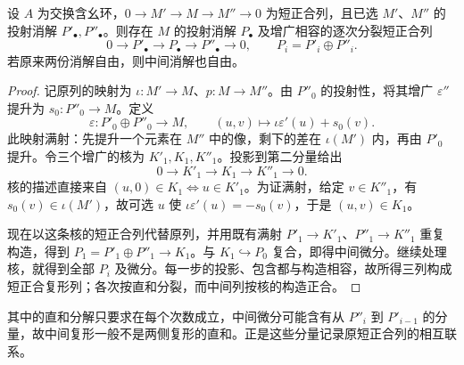 \begin{lemma}[马蹄引理]\label{g5:lem:horseshoe}
	设 \(A\) 为交换含幺环，\(0\to M'\to M\to M''\to0\) 为短正合列，且已选 \(M'\)、\(M''\) 的投射消解 \(P'_\bullet,P''_\bullet\)。则存在 \(M\) 的投射消解 \(P_\bullet\) 及增广相容的逐次分裂短正合列
	\[
		0\longrightarrow P'_\bullet\longrightarrow P_\bullet
		\longrightarrow P''_\bullet\longrightarrow0,
		\qquad P_i=P'_i\oplus P''_i.
	\]
	若原来两份消解自由，则中间消解也自由。
\end{lemma}
\begin{proof}
	记原列的映射为 \(\iota:M'\to M\)、\(p:M\to M''\)。由 \(P''_0\) 的投射性，将其增广 \(\varepsilon''\) 提升为 \(s_0:P''_0\to M\)。定义
	\[
		\varepsilon:P'_0\oplus P''_0\longrightarrow M,\qquad
		(u,v)\longmapsto\iota\varepsilon'(u)+s_0(v).
	\]
	此映射满射：先提升一个元素在 \(M''\) 中的像，剩下的差在 \(\iota(M')\) 内，再由 \(P'_0\) 提升。令三个增广的核为 \(K'_1,K_1,K''_1\)。投影到第二分量给出
	\[
		0\longrightarrow K'_1\longrightarrow K_1
		\longrightarrow K''_1\longrightarrow0.
	\]
	核的描述直接来自 \((u,0)\in K_1\iff u\in K'_1\)。为证满射，给定 \(v\in K''_1\)，有 \(s_0(v)\in\iota(M')\)，故可选 \(u\) 使 \(\iota\varepsilon'(u)=-s_0(v)\)，于是 \((u,v)\in K_1\)。

	现在以这条核的短正合列代替原列，并用既有满射 \(P'_1\to K'_1\)、\(P''_1\to K''_1\) 重复构造，得到 \(P_1=P'_1\oplus P''_1\to K_1\)。与 \(K_1\hookrightarrow P_0\) 复合，即得中间微分。继续处理核，就得到全部 \(P_i\) 及微分。每一步的投影、包含都与构造相容，故所得三列构成短正合复形列；各次按直和分裂，而中间列按核的构造正合。
\end{proof}

其中的直和分解只要求在每个次数成立，中间微分可能含有从 \(P''_i\) 到 \(P'_{i-1}\) 的分量，故中间复形一般不是两侧复形的直和。正是这些分量记录原短正合列的相互联系。

